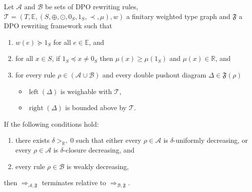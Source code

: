 \begin{theorem} 
    \label{nwf:thm:termination_grs}
    Let $\mathcal{A}$ and $\mathcal{B}$ be sets of DPO rewriting rules, $\mathcal{T} = (T,\mathbb{E}, (S, \oplus, \odot, 0_S, 1_S, \prec, \mu), w)$ a finitary weighted type graph and $\mathfrak{F}$ a DPO rewriting framework such that

     \begin{enumerate}[label=\roman*)]
        \item\label{thm1:hyp3} $w(e) \succeq 1_S$ for all $e \in \mathbb{E}$, and
        \item\label{thm1:hyp4} for all $x \in S$, if $ 1_S \preceq x \neq 0_S$ then $\mu(x) \geq \mu(1_S)$ and $\mu(x) \in \mathbb{R}$, and
        \item for every rule $\rho \in (\mathcal{A }\cup \mathcal{B })$ and every double pushout diagram  
        $\Delta \in \mathfrak{F}(\rho)$ 
        \begin{itemize}
            \item \(\operatorname{left}(\Delta)\) is weighable with \(\mathcal{T}\),
            \item \(\operatorname{right}(\Delta)\) is bounded above by \(\mathcal{T}\). 
        \end{itemize}
    \end{enumerate}       

    \noindent If the following conditions hold:
    \begin{enumerate}
        \item there exists $\delta >_{\mathbb{R}^+} 0$ such that either every $\rho \in \mathcal{A}$ is $\delta$-uniformly decreasing, or every $\rho \in \mathcal{A}$ is $\delta$-closure decreasing, and
        \item every rule $\rho \in \mathcal{B}$ is weakly decreasing,
    \end{enumerate}
    then $\Rightarrow_{\mathcal{A},\mathfrak{F}}$ terminates relative to $\Rightarrow_{\mathcal{B},\mathfrak{F}}$.
\end{theorem} 
 
